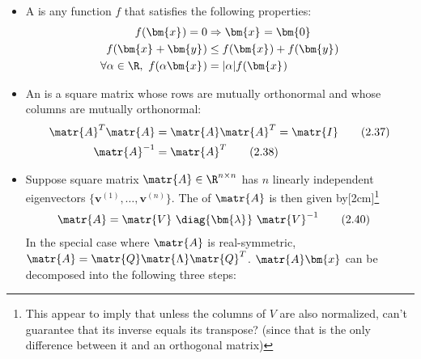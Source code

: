 \documentclass[11pt]{article}
\renewcommand\vec[2][]{\bm{#2}_{#1}}
\newcommand\tlab[1]{\tag{#1}\label{#1}}
\begin{document}
\begin{itemize}
	\item A  is any function $f$ that satisfies the following properties:
	\begin{align}
		f(\vec{x}) = 0 &\Rightarrow \vec{x} = \vec{0} \\
		f(\vec{x} + \vec{y}) &\le f(\vec{x}) + f(\vec{y}) \\
		\forall \alpha \in \R, ~ f(\alpha \vec{x}) &= |\alpha|f(\vec{x})
	\end{align}
	
	\item An  is a square matrix whose rows are mutually orthonormal and whose columns are mutually orthonormal:
	\begin{align}
		\matr{A}^T\matr{A} &= \matr{A}\matr{A}^T = \matr{I} \tlab{2.37} \\
		\matr{A}^{-1} &= \matr{A}^T \tlab{2.38}
	\end{align}
	
	\item Suppose square matrix $\matr{A} \in \R^{n \times n}$ has $n$ linearly independent eigenvectors $\{\vec{v}^{(1)}, \ldots, \vec{v}^{(n)}\}$. The  of $\matr{A}$ is then given by[2cm]\footnote{This appear to imply that unless the columns of $V$ are also normalized, can't guarantee that its inverse equals its transpose? (since that is the only difference between it and an orthogonal matrix)}
	\begin{align}
		\matr{A} &= \matr{V} ~  \diag{\vec{\lambda}} ~ \matr{V}^{-1} \tlab{2.40}
	\end{align}
	In the special case where $\matr{A}$ is real-symmetric, $\matr{A} = \matr{Q}\matr{\Lambda}\matr{Q}^T$.  $\matr{A}\vec{x}$ can be decomposed into the following three steps:


\end{itemize}
\end{document}
